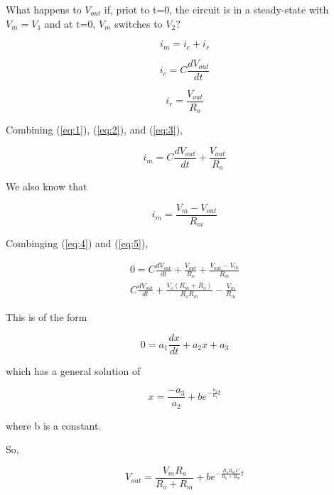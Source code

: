 \documentclass[12pt]{article}
\begin{document}
 

What happens to $V_{out}$ if, priot to t=0, the circuit is in a steady-state with $V_{m} = V_{1}$ and at t=0, $V_{m}$ switches to $V_{2}$?

\begin{equation} \label{eq:1} 
i_{m} = i_{c} + i_{r} 
\end{equation}

\begin{equation} \label{eq:2} 
i_{c} = C\frac{dV_{out}}{dt}
\end{equation}

\begin{equation} \label{eq:3} 
i_{r} = \frac{V_{out}}{R_{o}}
\end{equation}

Combining (\ref{eq:1}), (\ref{eq:2}), and (\ref{eq:3}),

\begin{equation} \label{eq:4} 
i_{m} = C\frac{dV_{out}}{dt} + \frac{V_{out}}{R_{o}}
\end{equation}

We also know that

\begin{equation} \label{eq:5} 
i_{m} = \frac{V_{m}-V_{out}}{R_{m}} 
\end{equation}

Combinging (\ref{eq:4}) and (\ref{eq:5}),

\begin{eqnarray*} \label{eq:6} 
0 = C\frac{dV_{out}}{dt} + \frac{V_{out}}{R_{o}} + \frac{V_{out}  - V_{m}}{R_{m}}\\
C\frac{dV_{out}}{dt} + \frac{V_{o}(R_{m} + R_{o})}{R_{o}R_{m}} - \frac{V_{m}}{R_{m}}
\end{eqnarray*}

This is of the form

\begin{equation} \label{eq:7}
0 = a_{1}\frac{dx}{dt} + a_{2}x + a_{3}
\end{equation}

which has a general solution of

\begin{equation} \label{eq:8}
x = \frac{-a_{3}}{a_{2}} + be^{-\frac{a_{2}}{a_{1}}t}
\end{equation}

where b is a constant.

So, 

\begin{equation} \label{eq:9}
V_{out} = \frac{V_{m}R_{o}}{R_{o}+R_{m}} + be^{-\frac{R_{o}R_{m}C}{R_{o} + R_{m}}t}
\end{equation}
\end{document}
